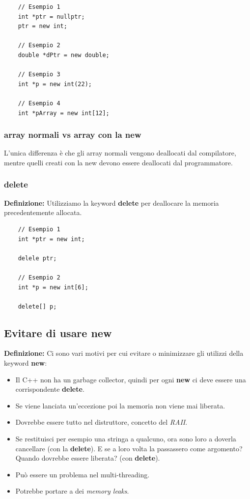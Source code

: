 \begin{lstlisting}
	// Esempio 1
	int *ptr = nullptr;
	ptr = new int;
	
	// Esempio 2
	double *dPtr = new double;
	
	// Esempio 3
	int *p = new int(22);
	
	// Esempio 4
	int *pArray = new int[12];
\end{lstlisting}

\subsubsection{array normali vs array con la new}

\textsf{\small L'unica differenza è che gli array normali vengono deallocati dal compilatore, mentre quelli creati con la new devono essere deallocati dal programmatore.} \break

\subsubsection{delete}

\textsf{\small \textbf{Definizione: } Utilizziamo la keyword \textbf{delete} per deallocare la memoria precedentemente allocata.} \\

\begin{lstlisting}
	// Esempio 1
	int *ptr = new int;
	
	delele ptr;
	
	// Esempio 2
	int *p = new int[6];
	
	delete[] p;
\end{lstlisting}

\subsection{Evitare di usare new}

\textsf{\small \textbf{Definizione: } Ci sono vari motivi per cui evitare o minimizzare gli utilizzi della keyword \textbf{new}: } \\

\begin{itemize}
	\item \textsf{\small Il C++ non ha un garbage collector, quindi per ogni \textbf{new} ci deve essere una corrispondente \textbf{delete}.}
	\item \textsf{\small Se viene lanciata un'eccezione poi la memoria non viene mai liberata.}
	\item \textsf{\small Dovrebbe essere tutto nel distruttore, concetto del \emph{RAII}.}
	\item \textsf{\small Se restituisci per esempio una stringa a qualcuno, ora sono loro a doverla cancellare (con la \textbf{delete}). E se a loro volta la passassero come argomento? Quando dovrebbe essere liberata? (con \textbf{delete}).}
	\item \textsf{\small Può essere un problema nel multi-threading.}
	\item \textsf{\small Potrebbe portare a dei \emph{memory leaks}.}
\end{itemize}

